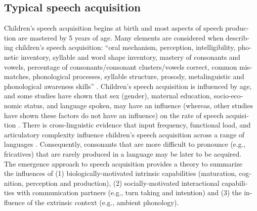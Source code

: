 \documentclass[output=paper,colorlinks,citecolor=brown]{langscibook}
\begin{document}
\begin{otherlanguage}{english}
\section{Typical speech acquisition}
Children’s speech acquisition begins at birth and most aspects of speech production are mastered by 5 years of age. Many elements are considered when describing children’s speech acquisition: “oral mechanism, perception, intelligibility, phonetic inventory, syllable and word shape inventory, mastery of consonants and vowels, percentage of consonants/consonant clusters/vowels correct, common mismatches, phonological processes, syllable structure, prosody, metalinguistic and phonological awareness skills” \citep[191]{McLeodBaker2017}. Children’s speech acquisition is influenced by age, and some studies have shown that sex (gender), maternal education, socio-economic status, and language spoken, may have an influence (whereas, other studies have shown these factors do not have an influence) on the rate of speech acquisition \citep{McLeodBaker2017}. There is cross-linguistic evidence that input frequency, functional load, and articulatory complexity influence children’s speech acquisition across a range of languages \citep{Ingram2012}. Consequently, consonants that are more difficult to pronounce (e.g., fricatives) that are rarely produced in a language may be later to be acquired. The emergence approach to speech acquisition \citep{Davis2013} provides a theory to summarize the influences of (1) biologically-motivated intrinsic capabilities (maturation, cognition, perception and production), (2) socially-motivated interactional capabilities with communication partners (e.g., turn taking and intention) and (3) the influence of the extrinsic context (e.g., ambient phonology).


\end{otherlanguage}
\end{document}
